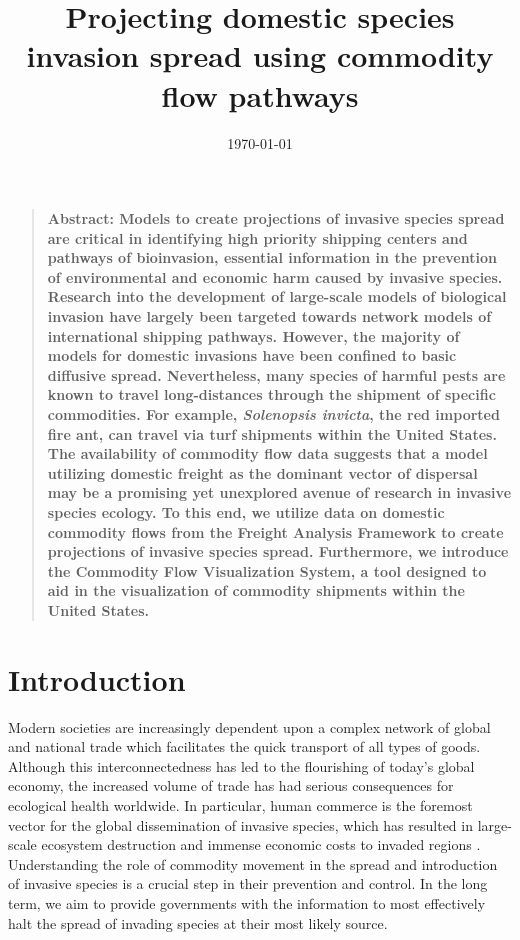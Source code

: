 \documentclass[12pt]{article}
\title{Projecting domestic species invasion spread using commodity flow pathways}
\author
{Ashish Gauli,$^{1,2}$ Nathan Wikle,$^{1,3}$ Ryan Yan,$^{1,4}$\\ 
Dr. Louis Gross,$^{1,5}$ Dr. Daniel Simberloff,$^{5}$ Angela Chuang,$^{5}$ Cedric Landerer$^{5}$\\
\\
\normalsize{$^{1}$National Institute for Mathematical and Biological Synthesis (NIMBioS)}\\
\normalsize{$^{2}$Biology and Computer Science, Fisk University}\\
\normalsize{$^{3}$Mathematics, Truman State University}\\
\normalsize{$^{4}$Mathematical Biology, College of William and Mary}\\
\normalsize{$^{5}$Ecology and Evolutionary Biology, University of Tennessee}\\
\\
}
\date{\today}
\newenvironment{sciabstract}{%
\begin{quote} \bf}
{\end{quote}}
\begin{document}
 


\baselineskip24pt


\maketitle 


 \begin{sciabstract}
Abstract: Models to create projections of invasive species spread are critical in identifying high priority shipping centers and pathways of bioinvasion, essential information in the prevention of environmental and economic harm caused by invasive species.  Research into the development of large-scale models of biological invasion have largely been targeted towards network models of international shipping pathways. However, the majority of models for domestic invasions have been confined to basic diffusive spread. Nevertheless, many species of harmful pests are known to travel long-distances through the shipment of specific commodities.  For example, \textit{Solenopsis invicta}, the red imported fire ant, can travel via turf shipments within the United States. The availability of commodity flow data suggests that a model utilizing domestic freight as the dominant vector of dispersal may be a promising yet unexplored avenue of research in invasive species ecology. To this end, we utilize data on domestic commodity flows from the Freight Analysis Framework to create projections of invasive species spread. Furthermore, we introduce the Commodity Flow Visualization System, a tool designed to aid in the visualization of commodity shipments within the United States.
\end{sciabstract}



\section*{Introduction}

Modern societies are increasingly dependent upon a complex network of global and national trade which facilitates the quick transport of all types of goods.  Although this interconnectedness has led to the flourishing of today's global economy, the increased volume of trade has had serious consequences for ecological health worldwide.  In particular, human commerce is the foremost vector for the global dissemination of invasive species, which has resulted in large-scale ecosystem destruction and immense economic costs to invaded regions \citep{Mack2000}.  Understanding the role of commodity movement in the spread and introduction of invasive species is a crucial step in their prevention and control.  In the long term, we aim to provide governments with the information to most effectively halt the spread of invading species at their most likely source.
\end{document}
